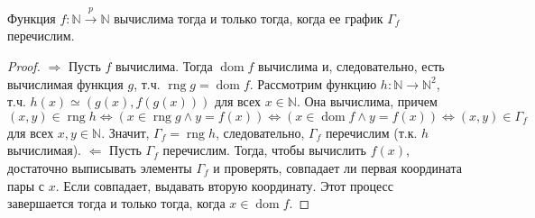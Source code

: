 \begin{theorem}
  Функция $f : \mathbb{N} \overset{p}{\to} \mathbb{N}$ вычислима тогда и только тогда, когда ее график $\Gamma_f$ перечислим.
  \begin{proof}
    $\Rightarrow$ \newline
    Пусть $f$ вычислима. Тогда $\operatorname{dom} f$ вычислима и, следовательно, есть вычислимая функция $g$, т.ч. $\operatorname{rng} g = \operatorname{dom} f$. Рассмотрим функцию $h : \mathbb{N} \to \mathbb{N}^2$, т.ч. $h(x) \simeq (g(x), f(g(x)))$ для всех $x \in \mathbb{N}$. Она вычислима, причем
    \[
      (x,y) \in \operatorname{rng} h \Leftrightarrow
      (x \in \operatorname{rng} g \wedge y = f(x)) \Leftrightarrow
      (x \in \operatorname{dom} f \wedge y = f(x)) \Leftrightarrow
      (x,y) \in \Gamma_f
    \]
    для всех $x,y \in \mathbb{N}$. Значит, $\Gamma_f = \operatorname{rng} h$, следовательно, $\Gamma_f$ перечислим (т.к. $h$ вычислимая). \newline
    $\Leftarrow$ \newline
    Пусть $\Gamma_f$ перечислим. Тогда, чтобы вычислить $f(x)$, достаточно выписывать элементы $\Gamma_f$ и проверять, совпадает ли первая координата пары с $x$. Если совпадает, выдавать вторую координату. Этот процесс завершается тогда и только тогда, когда $x \in \operatorname{dom} f$.
  \end{proof}
\end{theorem}